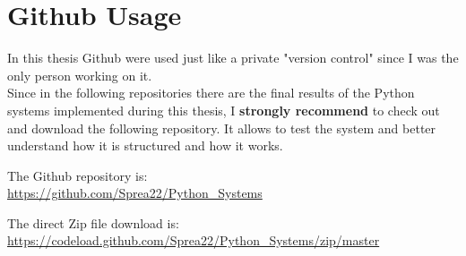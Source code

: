 \section{Github Usage}
In this thesis Github were used just like a private "version control" since I was the only person working on it. \\
Since in the following repositories there are the final results of the Python systems implemented during this thesis, I \textbf{strongly recommend} to check out and download the following repository. It allows to test the system and better understand how it is structured and how it works.

The Github repository is:\\
\url{https://github.com/Sprea22/Python_Systems}

The direct Zip file download is:\\
\url{https://codeload.github.com/Sprea22/Python_Systems/zip/master}


